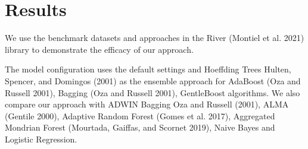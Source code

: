 \documentclass[
]{article}
\begin{document}
\hypertarget{results}{%
\section{Results}\label{results}}

We use the benchmark datasets and approaches in the River (Montiel et
al. 2021) library to demonstrate the efficacy of our approach.

The model configuration uses the default settings and Hoeffding Trees
Hulten, Spencer, and Domingos (2001) as the ensemble approach for
AdaBoost (Oza and Russell 2001), Bagging (Oza and Russell 2001),
GentleBoost algorithms. We also compare our approach with ADWIN Bagging
Oza and Russell (2001), ALMA (Gentile 2000), Adaptive Random Forest
(Gomes et al. 2017), Aggregated Mondrian Forest (Mourtada, Gaiffas, and
Scornet 2019), Naive Bayes and Logistic Regression.
\end{document}
